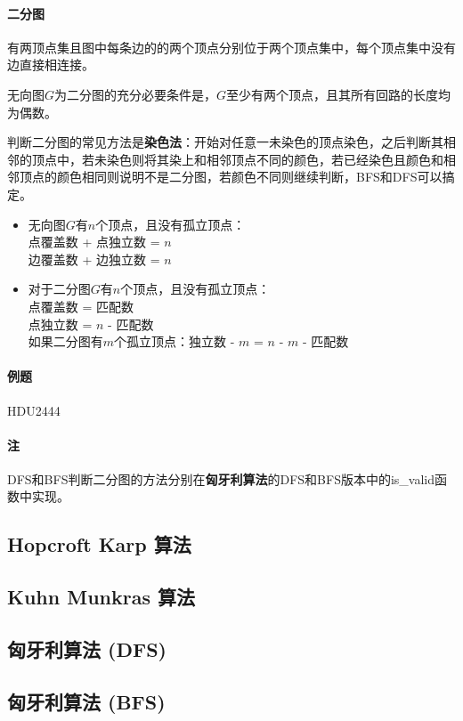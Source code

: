 \paragraph{二分图} 有两顶点集且图中每条边的的两个顶点分别位于两个顶点集中，每个顶点集中没有边直接相连接。

无向图$G$为二分图的充分必要条件是，$G$至少有两个顶点，且其所有回路的长度均为偶数。

判断二分图的常见方法是\textbf{染色法}：开始对任意一未染色的顶点染色，之后判断其相邻的顶点中，若未染色则将其染上和相邻顶点不同的颜色，若已经染色且颜色和相邻顶点的颜色相同则说明不是二分图，若颜色不同则继续判断，BFS和DFS可以搞定。

\begin{itemize}
  \item 无向图$G$有$n$个顶点，且没有孤立顶点：\\
  点覆盖数 + 点独立数 = $n$ \\
  边覆盖数 + 边独立数 = $n$
  \item 对于二分图$G$有$n$个顶点，且没有孤立顶点：\\
  点覆盖数 = 匹配数 \\
  点独立数 = $n$ - 匹配数 \\
  如果二分图有$m$个孤立顶点：独立数 - $m$ = $n$ - $m$ - 匹配数
\end{itemize}

\paragraph{例题} HDU2444

\paragraph{注} DFS和BFS判断二分图的方法分别在\textbf{匈牙利算法}的DFS和BFS版本中的is\_valid函数中实现。

\subsection{Hopcroft Karp 算法}


\subsection{Kuhn Munkras 算法}


\subsection{匈牙利算法 (DFS)}


\subsection{匈牙利算法 (BFS)}

